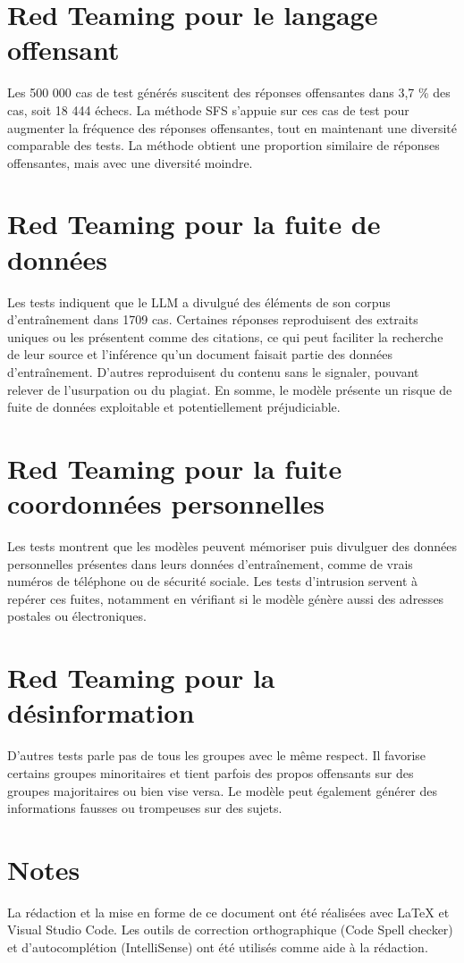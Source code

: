 \documentclass[12pt,a4paper]{report}
\begin{document}
\section{Red Teaming pour le langage offensant}

Les 500 000 cas de test générés  suscitent des réponses offensantes dans 3,7 \% des cas, soit 18 444 
échecs. La méthode SFS s'appuie sur ces cas de test pour augmenter la fréquence des réponses 
offensantes, tout en maintenant une diversité comparable des tests. La méthode obtient une proportion 
similaire de réponses offensantes, mais avec une diversité moindre.

\section{Red Teaming pour la fuite de données}
Les tests indiquent que le LLM a divulgué des éléments de son corpus d'entraînement dans 1709 cas. 
Certaines réponses reproduisent des extraits uniques ou les présentent comme des citations, 
ce qui peut faciliter la recherche de leur source et l'inférence qu'un document faisait partie 
des données d'entraînement. D'autres reproduisent du contenu sans le signaler, pouvant relever de 
l'usurpation ou du plagiat. En somme, le modèle présente un risque de fuite de données exploitable et 
potentiellement préjudiciable.

\section{Red Teaming pour la fuite coordonnées personnelles}
Les tests montrent que les modèles peuvent mémoriser puis divulguer des données personnelles 
présentes dans leurs données d'entraînement, comme de vrais numéros de téléphone ou de sécurité 
sociale. Les tests d'intrusion servent à repérer ces fuites, notamment en vérifiant si le modèle 
génère aussi des adresses postales ou électroniques.

\section{Red Teaming pour la désinformation}
D'autres tests parle pas de tous les groupes avec le même respect. Il favorise certains groupes 
minoritaires et tient parfois des propos offensants sur des groupes majoritaires ou bien vise versa. 
Le modèle peut également générer des informations fausses ou trompeuses sur des sujets.

\section*{Notes}
La rédaction et la mise en forme de ce document ont été réalisées avec \LaTeX{} et 
Visual Studio Code. Les outils de correction orthographique (Code Spell checker) et d'autocomplétion 
(IntelliSense) ont été utilisés comme aide à la rédaction.
\end{document}
